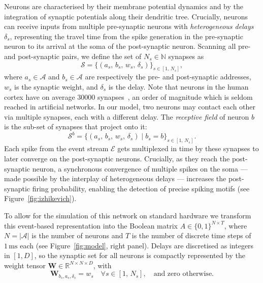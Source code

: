 \documentclass{scrartcl}
\newcommand{\citep}[1]{\parencite{#1}}
\begin{document}
Neurons are characterised by their membrane potential dynamics and by the integration of synaptic potentials along their dendritic tree. Crucially, neurons can receive inputs from multiple pre-synaptic neurons with \emph{heterogeneous delays} $\delta_s$, representing the travel time from the spike generation in the pre-synaptic neuron to its arrival at the soma of the post-synaptic neuron. Scanning all pre- and post-synaptic pairs, we define the set of $N_s \in \mathbb{N}$ synapses as
\[
  \mathcal{S}
  = \bigl\{(a_s,\, b_s,\, w_s,\, \delta_s)\bigr\}_{s \in [1,\, N_s]},
\]
where $a_s \in \mathcal{A}$ and $b_s \in \mathcal{A}$ are respectively the pre- and post-synaptic addresses, $w_s$ is the synaptic weight, and $\delta_s$ is the delay. Note that neurons in the human cortex have on average 30000 synapses~\citep{Rockland2002}, an order of magnitude which is seldom reached in artificial networks. In our model, two neurons may contact each other via multiple synapses, each with a different delay. The \emph{receptive field} of neuron $b$ is the sub-set of synapses that project onto it:
\[
  \mathcal{S}^b
  = \bigl\{(a_s,\, b_s,\, w_s,\, \delta_s) \mid b_s = b
    \bigr\}_{s \in [1,\, N_s]}.
\]
Each spike from the event stream $\mathcal{E}$ gets multiplexed in time by these synapses to later converge on the post-synaptic neurons.
Crucially, as they reach  the post-synaptic neuron, a synchronous convergence of multiple spikes on the soma --- made possible by the interplay of heterogeneous delays --- increases the post-synaptic firing probability, enabling the detection of precise spiking motifs (see Figure~\ref{fig:izhikevich}).

To allow for the simulation of this network on standard hardware we transform this event-based representation into the Boolean matrix $A \in \{0,1\}^{N \times T}$, where $N = |\mathcal{A}|$ is the number of neurons and $T$ is the number of discrete time steps of $1\,\mathrm{ms}$ each (see Figure~\ref{fig:model}, right panel). Delays are discretised as integers in $[1, D]$, so the synaptic set for all neurons is compactly represented by
the weight tensor
$\mathbf{W} \in \mathbb{R}^{N \times N \times D}$, with
\[
  \mathbf{W}_{b_s, a_s, \delta_s} = w_s
  \quad \forall s \in [1,\, N_s],
  \quad \text{and zero otherwise.}
\]
\end{document}
